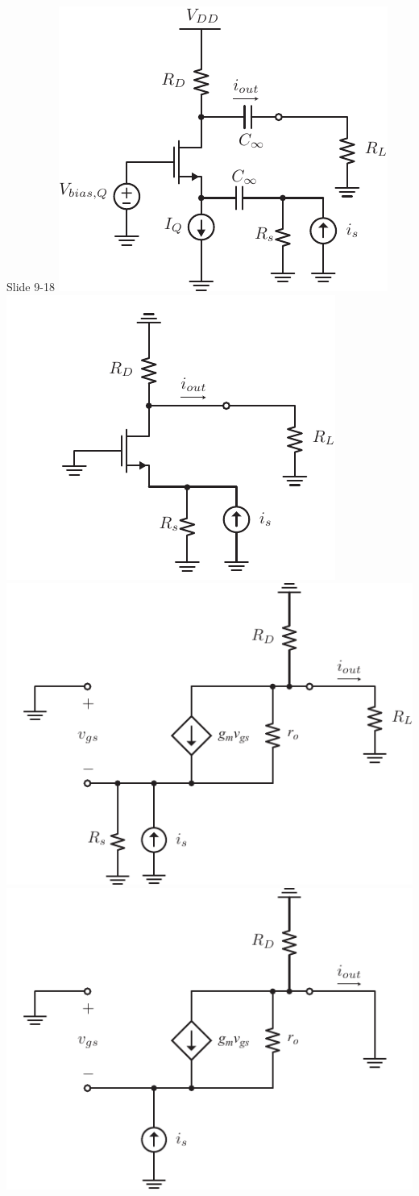 Slide 9-18
\includegraphics[width=.75\columnwidth]{cgamp_is}
\includegraphics[width=.75\columnwidth]{cgamp_is_ac}
\includegraphics[width=.75\columnwidth]{cgamp_is_ac_ss}
\includegraphics[width=.75\columnwidth]{cgamp_is_ac_ss_short}

